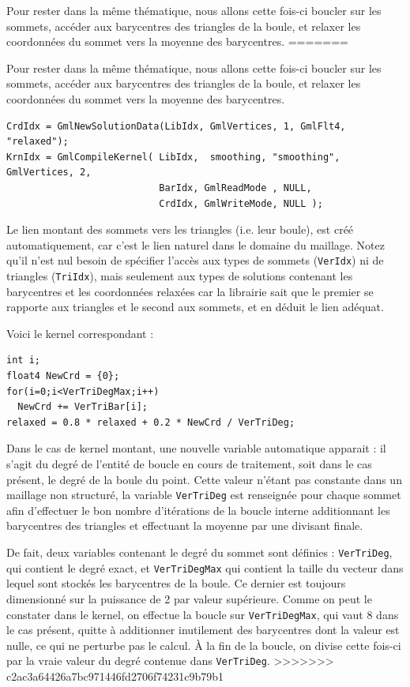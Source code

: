 \documentclass[a4paper,12pt]{article}
\begin{document}
Pour rester dans la même thématique, nous allons cette fois-ci boucler sur les sommets, accéder aux barycentres des triangles de la boule, et relaxer les coordonnées du sommet vers la moyenne des barycentres.
=======

Pour rester dans la même thématique, nous allons cette fois-ci boucler sur les sommets, accéder aux barycentres des triangles de la boule, et relaxer les coordonnées du sommet vers la moyenne des barycentres.

\begin{tt}
\begin{verbatim}
CrdIdx = GmlNewSolutionData(LibIdx, GmlVertices, 1, GmlFlt4, "relaxed");
KrnIdx = GmlCompileKernel( LibIdx,  smoothing, "smoothing", GmlVertices, 2,
                           BarIdx, GmlReadMode , NULL,
                           CrdIdx, GmlWriteMode, NULL );
\end{verbatim}
\end{tt}
\normalfont

Le lien montant des sommets vers les triangles (i.e. leur boule), est créé automatiquement, car c'est le lien naturel dans le domaine du maillage.
Notez qu'il n'est nul besoin de spécifier l'accès aux types de sommets ({\tt VerIdx}) ni de triangles ({\tt TriIdx}), mais seulement aux types de solutions contenant les barycentres et les coordonnées relaxées car la librairie sait que le premier se rapporte aux triangles et le second aux sommets, et en déduit le lien adéquat.

Voici le kernel correspondant :
\begin{tt}
\begin{verbatim}
int i;
float4 NewCrd = {0};
for(i=0;i<VerTriDegMax;i++)
  NewCrd += VerTriBar[i];
relaxed = 0.8 * relaxed + 0.2 * NewCrd / VerTriDeg;
\end{verbatim}
\end{tt}
\normalfont

Dans le cas de kernel montant, une nouvelle variable automatique apparait : il s'agit du degré de l'entité de boucle en cours de traitement, soit dans le cas présent, le degré de la boule du point.
Cette valeur n'étant pas constante dans un maillage non structuré, la variable {\tt VerTriDeg} est renseignée pour chaque sommet afin d'effectuer le bon nombre d'itérations de la boucle interne additionnant les barycentres des triangles et effectuant la moyenne par une divisant finale.

De fait, deux variables contenant le degré du sommet sont définies : {\tt VerTriDeg}, qui contient le degré exact, et {\tt VerTriDegMax} qui contient la taille du vecteur dans lequel sont stockés les barycentres de la boule.
Ce dernier est toujours dimensionné sur la puissance de 2 par valeur supérieure.
Comme on peut le constater dans le kernel, on effectue la boucle sur {\tt VerTriDegMax}, qui vaut 8 dans le cas présent, quitte à additionner inutilement des barycentres dont la valeur est nulle, ce qui ne perturbe pas le calcul.
À la fin de la boucle, on divise cette fois-ci par la vraie valeur du degré contenue dans {\tt VerTriDeg}.
>>>>>>> c2ac3a64426a7bc971446fd2706f74231c9b79b1
\end{document}
